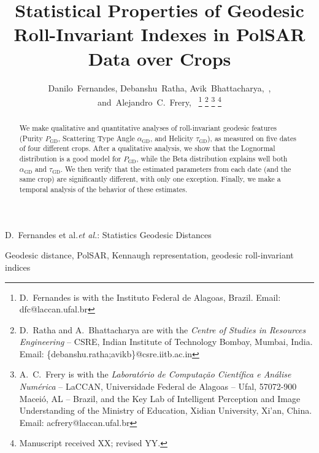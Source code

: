 \documentclass[journal]{IEEEtran}
\begin{document}
	
	\title{Statistical Properties of Geodesic Roll-Invariant Indexes in PolSAR Data over Crops}
	
	\author{Danilo~Fernandes,
		Debanshu~Ratha,
		Avik~Bhattacharya,~,
		and~Alejandro~C.~Frery,~%
		\thanks{D.\ Fernandes is with the Instituto Federal de Alagoas, Brazil. Email: dfc@laccan.ufal.br}%
		\thanks{D.\ Ratha and A.\ Bhattacharya are with the \textit{Centre of Studies in Resources Engineering}
			-- CSRE, Indian Institute of Technology Bombay, Mumbai, India. Email: \{debanshu.ratha;avikb\}@csre.iitb.ac.in}%
		\thanks{A.\ C.\ Frery is with the \textit{Laborat\'orio de Computa\c c\~ao Cient\'ifica e An\'alise Num\'erica} -- LaCCAN, 
			Universidade Federal de Alagoas -- Ufal, 
			57072-900 Macei\'o, AL -- Brazil, and the Key Lab of Intelligent Perception and Image Understanding of the Ministry of Education, Xidian University, Xi'an, China. Email: acfrery@laccan.ufal.br}
		\thanks{Manuscript received XX; revised YY.}}
	
	{D.\ Fernandes et al.\MakeLowercase{\textit{et al.}}: Statistics Geodesic Distances}
	
	\maketitle
	
	\begin{abstract}
		We make qualitative and quantitative analyses of roll-invariant geodesic features (Purity $P_{\text{GD}}$, Scattering Type Angle $\alpha_{\text{GD}}$, and Helicity $\tau_{\text{GD}}$), as measured on five dates of four different crops.
		After a qualitative analysis, we show that the Lognormal distribution is a good model for $P_{\text{GD}}$, while the Beta distribution explains well both $\alpha_{\text{GD}}$ and $\tau_{\text{GD}}$.
		We then verify that the estimated parameters from each date (and the same crop) are significantly different, with only one exception.
		Finally, we make a temporal analysis of the behavior of these estimates.
	\end{abstract}
	
	\begin{IEEEkeywords}
		Geodesic distance, PolSAR, Kennaugh representation, geodesic roll-invariant indices
	\end{IEEEkeywords}
	
\end{document}
